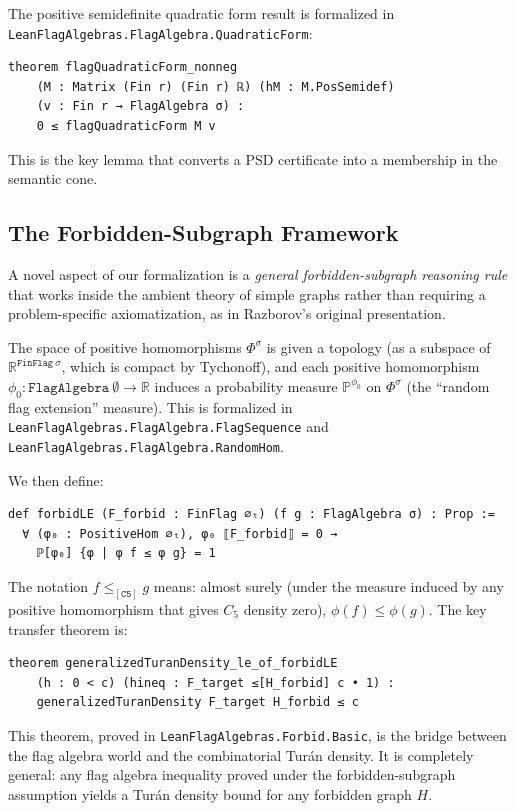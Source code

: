 \documentclass{article}
\newcommand{\R}{\mathbb{R}}
\newcommand{\poshom}[1]{\Phi^{#1}}
\newcommand{\lean}[1]{\texttt{#1}}
\begin{document}
The positive semidefinite quadratic form result is formalized in
\lean{LeanFlagAlgebras.FlagAlgebra.QuadraticForm}:
\begin{lstlisting}
theorem flagQuadraticForm_nonneg
    (M : Matrix (Fin r) (Fin r) ℝ) (hM : M.PosSemidef)
    (v : Fin r → FlagAlgebra σ) :
    0 ≤ flagQuadraticForm M v
\end{lstlisting}
This is the key lemma that converts a PSD certificate into a membership in the
semantic cone.

\subsection{The Forbidden-Subgraph Framework}
\label{sec:forbidden}

A novel aspect of our formalization is a \emph{general forbidden-subgraph
reasoning rule} that works inside the ambient theory of simple graphs rather
than requiring a problem-specific axiomatization, as in Razborov's original
presentation.

The space of positive homomorphisms $\poshom{\sigma}$ is given a topology (as a
subspace of $\R^{\lean{FinFlag}\ \sigma}$, which is compact by Tychonoff), and
each positive homomorphism $\phi_0 : \lean{FlagAlgebra}\ \emptyset \to \R$
induces a probability measure $\mathbb{P}^{\phi_0}$ on $\poshom{\sigma}$ (the
``random flag extension'' measure).  This is formalized in
\lean{LeanFlagAlgebras.FlagAlgebra.FlagSequence} and
\lean{LeanFlagAlgebras.FlagAlgebra.RandomHom}.

We then define:
\begin{lstlisting}
def forbidLE (F_forbid : FinFlag ∅ₜ) (f g : FlagAlgebra σ) : Prop :=
  ∀ (φ₀ : PositiveHom ∅ₜ), φ₀ ⟦F_forbid⟧ = 0 →
    ℙ[φ₀] {φ | φ f ≤ φ g} = 1
\end{lstlisting}
The notation $f \leq_{[\mathtt{C5}]} g$ means: almost surely (under the
measure induced by any positive homomorphism that gives $C_5$ density zero),
$\phi(f) \leq \phi(g)$.  The key transfer theorem is:
\begin{lstlisting}
theorem generalizedTuranDensity_le_of_forbidLE
    (h : 0 < c) (hineq : F_target ≤[H_forbid] c • 1) :
    generalizedTuranDensity F_target H_forbid ≤ c
\end{lstlisting}
This theorem, proved in \lean{LeanFlagAlgebras.Forbid.Basic}, is the bridge
between the flag algebra world and the combinatorial Turán density.  It is
completely general: any flag algebra inequality proved under the
forbidden-subgraph assumption yields a Turán density bound for any forbidden
graph $H$.
\end{document}
